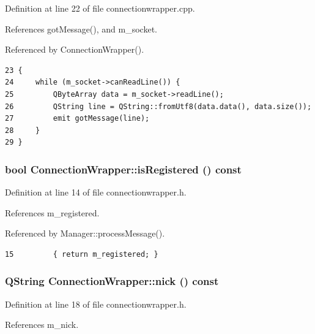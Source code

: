 Definition at line 22 of file connectionwrapper.cpp.

References gotMessage(), and m\_\-socket.

Referenced by ConnectionWrapper().

\begin{Code}\begin{verbatim}23 {
24     while (m_socket->canReadLine()) {
25         QByteArray data = m_socket->readLine();
26         QString line = QString::fromUtf8(data.data(), data.size());
27         emit gotMessage(line);
28     }
29 }
\end{verbatim}
\end{Code}


\subsubsection{\setlength{\rightskip}{0pt plus 5cm}bool ConnectionWrapper::isRegistered () const\hspace{0.3cm}{\tt  [inline]}}\label{classConnectionWrapper_4de247e37d2a65d8e03e96059972c63e}




Definition at line 14 of file connectionwrapper.h.

References m\_\-registered.

Referenced by Manager::processMessage().

\begin{Code}\begin{verbatim}15         { return m_registered; }
\end{verbatim}
\end{Code}


\subsubsection{\setlength{\rightskip}{0pt plus 5cm}QString ConnectionWrapper::nick () const\hspace{0.3cm}{\tt  [inline]}}\label{classConnectionWrapper_37aa4d516964c5bd9d95e77b79c98ad7}




Definition at line 18 of file connectionwrapper.h.

References m\_\-nick.

